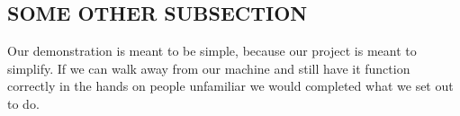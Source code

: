 \documentclass[conference]{IEEEtran}
\begin{document}
\subsection{SOME OTHER SUBSECTION}
Our demonstration
is meant to be simple, because our project is meant to simplify. If we can walk away from our
machine and still have it function correctly in the hands on people unfamiliar we would completed
what we set out to do.

% 
% 

{}

\end{document}

